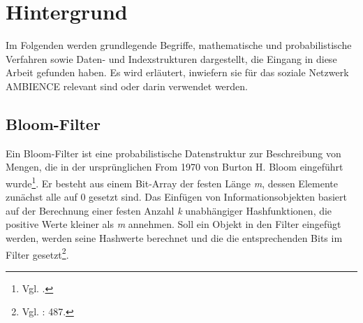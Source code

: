 \chapter{Hintergrund}\label{ch:hintergrund}
Im Folgenden werden grundlegende Begriffe, mathematische und probabilistische Verfahren sowie Daten- und Indexstrukturen dargestellt, die Eingang in diese Arbeit gefunden haben. Es wird erläutert, inwiefern sie für das soziale Netzwerk AMBIENCE relevant sind oder darin verwendet werden. 
\section{Bloom-Filter}\label{sec:bloom}
Ein Bloom-Filter ist eine probabilistische Datenstruktur zur Beschreibung von Mengen, die in der ursprünglichen From 1970 von Burton H. Bloom eingeführt wurde\footnote{Vgl. \cite{Bloom1970}.}. Er besteht aus einem Bit-Array der festen Länge \textit{m}, dessen Elemente zunächst alle auf 0 gesetzt sind. Das Einfügen von Informationsobjekten basiert auf der Berechnung einer festen Anzahl \textit{k} unabhängiger Hashfunktionen, die positive Werte kleiner als \textit{m} annehmen. Soll ein Objekt in den Filter eingefügt werden, werden seine Hashwerte berechnet und die die entsprechenden Bits im Filter gesetzt\footnote{Vgl. \cite{Broder2004}: 487.}. 

